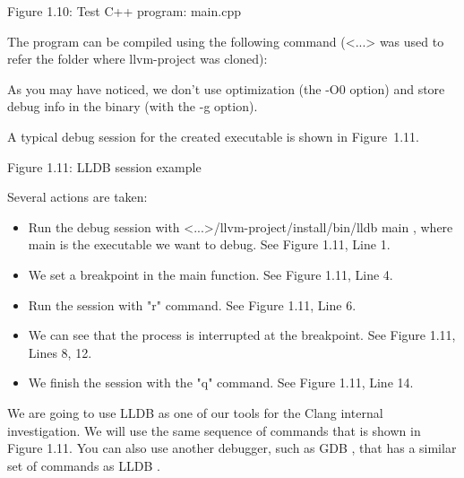 \begin{center}
Figure 1.10: Test C++ program: main.cpp
\end{center}

The program can be compiled using the following command (<...> was used to refer the folder where llvm-project was cloned):


As you may have noticed, we don’t use optimization (the -O0 option) and store debug info in the binary (with the -g option).

A typical debug session for the created executable is shown in Figure 1.11.


\begin{center}
Figure 1.11: LLDB session example
\end{center}

Several actions are taken:

\begin{itemize}
\item
Run the debug session with <...>/llvm-project/install/bin/lldb main , where main is the executable we want to debug. See Figure 1.11, Line 1.

\item
We set a breakpoint in the main function. See Figure 1.11, Line 4.

\item
Run the session with "r" command. See Figure 1.11, Line 6.

\item
We can see that the process is interrupted at the breakpoint. See Figure 1.11, Lines 8, 12.

\item
We finish the session with the "q" command. See Figure 1.11, Line 14.
\end{itemize}

We are going to use LLDB as one of our tools for the Clang internal investigation. We will use the same sequence of commands that is shown in Figure 1.11. You can also use another debugger, such as GDB , that has a similar set of commands as LLDB .






